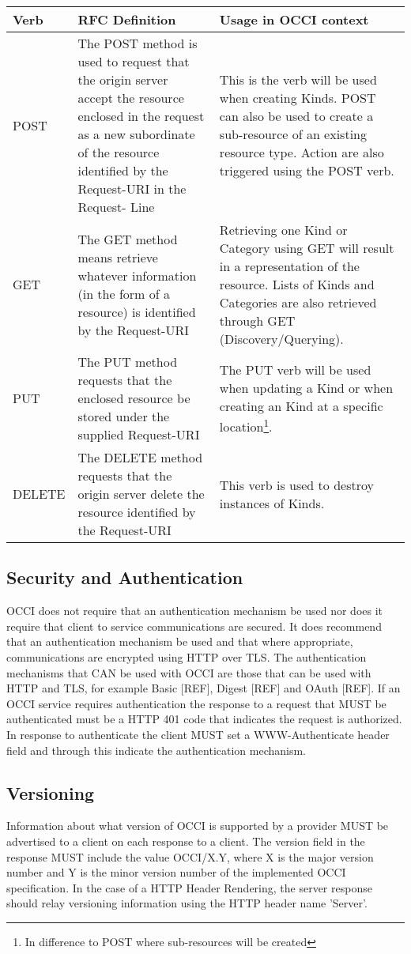 \documentclass[10pt,a4paper]{article}
\begin{document}
\begin{tabular}{l|p{3.2in}|p{2in}}
Verb & RFC Definition & Usage in OCCI context \\
\hline
POST & The POST method is used to request that the origin server accept the resource enclosed in the request as a new subordinate of the resource identified by the Request-URI in the Request- Line & This is the verb will be used when creating Kinds. POST can also be used to create a sub-resource of an existing resource type. Action are also triggered using the POST verb. \\
GET & The GET method means retrieve whatever information (in the form of a resource) is identified by the Request-URI & Retrieving one Kind or Category using GET will result in a representation of the resource. Lists of Kinds and Categories are also retrieved through GET (Discovery/Querying). \\
PUT & The PUT method requests that the enclosed resource be stored under the supplied Request-URI & The PUT verb will be used when updating a Kind or when creating an Kind at a specific location\footnote{In difference to POST where sub-resources will be created}. \\
DELETE & The DELETE method requests that the origin server delete the resource identified by the Request-URI & This verb is used to destroy instances of Kinds. \\ 
\end{tabular}

\subsection{Security and Authentication}
OCCI does not require that an authentication mechanism be used nor
does it require that client to service communications are secured. It
does recommend that an authentication mechanism be used and that where
appropriate, communications are encrypted using HTTP over TLS. The
authentication mechanisms that CAN be used with OCCI are those that
can be used with HTTP and TLS, for example Basic [REF], Digest [REF]
and OAuth [REF]. If an OCCI service requires authentication the
response to a request that MUST be authenticated must be a HTTP 401
code that indicates the request is authorized. In response to
authenticate the client MUST set a WWW-Authenticate header field and
through this indicate the authentication mechanism.

\subsection{Versioning}
Information about what version of OCCI is supported by a provider MUST
be advertised to a client on each response to a client. The version
field in the response MUST include the value OCCI/X.Y, where X is the
major version number and Y is the minor version number of the
implemented OCCI specification. In the case of a HTTP Header
Rendering, the server response should relay versioning information
using the HTTP header name 'Server'.
\end{document}
